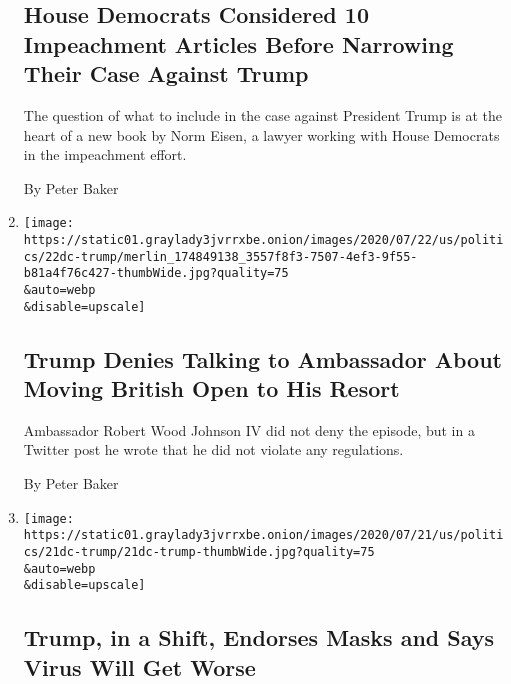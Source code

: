 \begin{enumerate}
  \hypertarget{house-democrats-considered-10-impeachment-articles-before-narrowing-their-case-against-trump}{%
  \subsection{House Democrats Considered 10 Impeachment Articles Before
  Narrowing Their Case Against
  Trump}\label{house-democrats-considered-10-impeachment-articles-before-narrowing-their-case-against-trump}}

  The question of what to include in the case against President Trump is
  at the heart of a new book by Norm Eisen, a lawyer working with House
  Democrats in the impeachment effort.

  By Peter Baker
\item
  \href{/2020/07/22/us/politics/trump-turnberry-british-open.html}{}

  \texttt{[image: https://static01.graylady3jvrrxbe.onion/images/2020/07/22/us/politics/22dc-trump/merlin\_174849138\_3557f8f3-7507-4ef3-9f55-b81a4f76c427-thumbWide.jpg?quality=75\\\&auto=webp\\\&disable=upscale]}

  \hypertarget{trump-denies-talking-to-ambassador-about-moving-british-open-to-his-resort}{%
  \subsection{Trump Denies Talking to Ambassador About Moving British
  Open to His
  Resort}\label{trump-denies-talking-to-ambassador-about-moving-british-open-to-his-resort}}

  Ambassador Robert Wood Johnson IV did not deny the episode, but in a
  Twitter post he wrote that he did not violate any regulations.

  By Peter Baker
\item
  \href{/2020/07/21/us/politics/trump-coronavirus-masks.html}{}

  \texttt{[image: https://static01.graylady3jvrrxbe.onion/images/2020/07/21/us/politics/21dc-trump/21dc-trump-thumbWide.jpg?quality=75\\\&auto=webp\\\&disable=upscale]}

  \hypertarget{trump-in-a-shift-endorses-masks-and-says-virus-will-get-worse}{%
  \subsection{Trump, in a Shift, Endorses Masks and Says Virus Will Get
  Worse}\label{trump-in-a-shift-endorses-masks-and-says-virus-will-get-worse}}


\end{enumerate}
